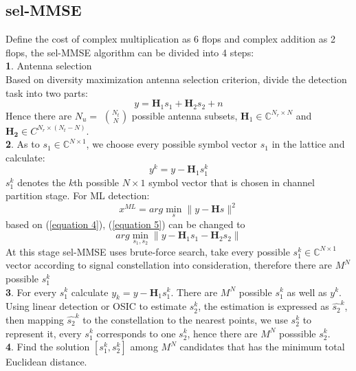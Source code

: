 \documentclass[12pt,a4paper,final]{article}
\begin{document}
\begin{spacing}{2.5}
\subsection{sel-MMSE}\label{sel-MMSE}
Define the cost of complex multiplication as 6 flops and complex addition as 2 flops, the sel-MMSE algorithm can be divided into 4 steps\cite{2}:\\
\textbf{1}. Antenna selection\\
Based on diversity maximization antenna selection criterion, divide the detection task into two parts:
\begin{equation}
y=\mathbf{H}_{1}s_{1}+\mathbf{H}_{2}s_{2}+n\label{equation 4}
\end{equation}
Hence there are $N_{u}=$ $N_{t}\choose N$ possible antenna subsets, $\mathbf{H}_{1}\in \mathbb{C}^{N_{r}\times N}$ and $\mathbf{H_{2}}\in C^{N_{r}\times (N_{t}-N)}$.\\
\textbf{2}. As to $s_{1}\in \mathbb{C}^{N\times 1}$, we choose every possible symbol vector $s_{1}$ in the lattice and calculate:
\begin{equation}
y^{k}=y-\mathbf{H}_{1}s_{1}^{k}   \label{equation41}
\end{equation}
$s_{1}^{k}$ denotes the $k$th possible $N\times 1$ symbol vector that is chosen in channel partition stage.
For ML detection:
\begin{equation}
x^{ML}=arg\min_{s}\parallel y-\mathbf{H}s \parallel^{2}\label{equation 5}
\end{equation}
based on (\ref{equation 4}), (\ref{equation 5}) can be changed to
\begin{equation}
arg\min_{s_{1},s_{2}}\parallel y-\mathbf{H}_{1}s_{1}-\mathbf{H}_{2}s_{2} \parallel
\end{equation} 
At this stage sel-MMSE uses brute-force search, take every possible $s_{1}^{k}\in \mathbb{C}^{N\times 1}$ vector according to signal constellation into consideration, therefore there are $M^N$ possible $s_{1}^{k}$ \\
\textbf{3}. For every $s_{1}^{k}$ calculate $y_{k}=y-\mathbf{H}_{1}s_{1}^{k}$. There are $M^{N}$ possible $s_{1}^{k}$ as well as $y^{k}$. Using linear detection or OSIC to estimate $s_{2}^{k}$, the estimation is expressed as $\hat{s_{2}}^{k}$, then mapping $\hat{s_{2}}^{k}$ to the constellation to the nearest points, we use $s_{2}^{k}$ to represent it, every $s_{1}^{k}$ corresponds to one $s_{2}^{k}$, hence there are $M^{N}$ posssible $s_{2}^{k}$.\\
\textbf{4}. Find the solution $[s_{1}^{k},s_{2}^{k}]$ among $M^{N}$ candidates that has the minimum total Euclidean distance.\\

\end{spacing}
\end{document}
